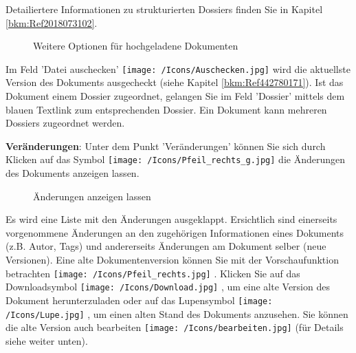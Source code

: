 Detailiertere Informationen zu strukturierten Dossiers finden Sie in Kapitel \ref{bkm:Ref2018073102}.

\vspace{\baselineskip}

\begin{figure}[H]
\caption{Weitere Optionen für hochgeladene Dokumenten}
\end{figure}

Im Feld 'Datei auschecken' \texttt{[image: /Icons/Auschecken.jpg]}  wird die aktuellste Version des Dokuments ausgecheckt (siehe Kapitel \ref{bkm:Ref442780171}). Ist das Dokument einem Dossier zugeordnet, gelangen Sie im Feld 'Dossier' mittels dem blauen Textlink  zum entsprechenden Dossier. Ein Dokument kann mehreren Dossiers zugeordnet werden.

\vspace{\baselineskip}

\textbf{Veränderungen}: Unter dem Punkt 'Veränderungen' können Sie sich durch Klicken auf das Symbol \texttt{[image: /Icons/Pfeil\_rechts\_g.jpg]}  die Änderungen des Dokuments anzeigen lassen.

\begin{figure}[H]
\caption{Änderungen anzeigen lassen}
\end{figure}

Es wird eine Liste mit den Änderungen ausgeklappt. Ersichtlich sind einerseits vorgenommene Änderungen an den zugehörigen Informationen eines Dokuments (z.B. Autor, Tags) und andererseits Änderungen am Dokument selber (neue Versionen). Eine alte Dokumentenversion können Sie mit der Vorschaufunktion betrachten \texttt{[image: /Icons/Pfeil\_rechts.jpg]} . Klicken Sie auf das Downloadsymbol \texttt{[image: /Icons/Download.jpg]} , um eine alte Version des Dokument herunterzuladen oder auf das Lupensymbol \texttt{[image: /Icons/Lupe.jpg]} , um einen alten Stand des Dokuments anzusehen. Sie können die alte Version auch bearbeiten \texttt{[image: /Icons/bearbeiten.jpg]}  (für Details siehe weiter unten).\newline

